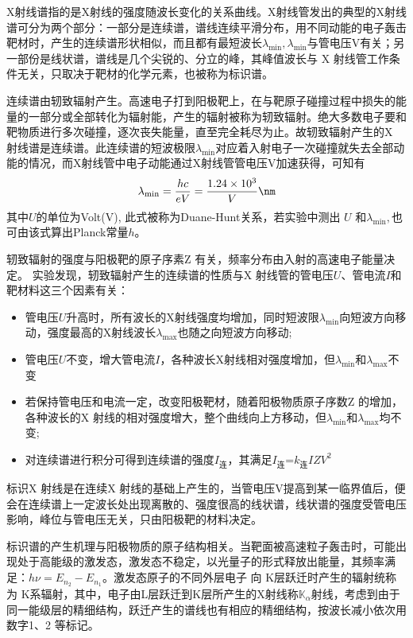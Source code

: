 \documentclass[10.5pt]{article}
\renewcommand{\=}[1]{\stackrel{#1}{=}} %
\theoremstyle{definition}
\theoremstyle{remark}
\begin{document}
	X射线谱指的是X射线的强度随波长变化的关系曲线。X射线管发出的典型的X射线 谱可分为两个部分：一部分是连续谱，谱线连续平滑分布，用不同动能的电子轰击靶材时，产生的连续谱形状相似，而且都有最短波长$\lambda_{\min},\lambda_{\min}$与管电压V有关；另一部份是线状谱，谱线是几个尖锐的、分立的峰，其峰值波长与 X 射线管工作条件无关，只取决于靶材的化学元素，也被称为标识谱。
	
	连续谱由轫致辐射产生。高速电子打到阳极靶上，在与靶原子碰撞过程中损失的能量的一部分或全部转化为辐射能，产生的辐射被称为轫致辐射。绝大多数电子要和靶物质进行多次碰撞，逐次丧失能量，直至完全耗尽为止。故轫致辐射产生的X 射线谱是连续谱。此连续谱的短波极限$\lambda_{\min}$对应着入射电子一次碰撞就失去全部动能的情况，而X射线管中电子动能通过X射线管管电压V加速获得，可知有
	\begin{equation}\label{eq:DH}
		\lambda_{\min}=\dfrac{hc}{eV}=\dfrac{1.24\times10^3}{V}\nm
	\end{equation}
	其中$U$的单位为Volt(V), 此式被称为Duane-Hunt关系，若实验中测出 $U$ 和$\lambda_{\min},$也可由该式算出Planck常量$h$。
	
	轫致辐射的强度与阳极靶的原子序素Z 有关，频率分布由入射的高速电子能量决定。 
	实验发现，轫致辐射产生的连续谱的性质与X 射线管的管电压$U$、管电流$I$和靶材料这三个因素有关：
	\begin{itemize}
		\item 管电压$U$升高时，所有波长的X射线强度均增加，同时短波限$\lambda_{\min}$向短波方向移动，强度最高的X射线波长$\lambda_{\max}$也随之向短波方向移动;
		\item 管电压$U$不变，增大管电流$I$，各种波长X射线相对强度增加，但$\lambda_{\min}$和$\lambda_{\max}$不变
		\item 若保持管电压和电流一定，改变阳极靶材，随着阳极物质原子序数Z 的增加，各种波长的X 射线的相对强度增大，整个曲线向上方移动，但$\lambda_{\min}$和$\lambda_{\max}$均不变;
		\item 对连续谱进行积分可得到连续谱的强度$I_{\text{连}}$，其满足$I_{\text{连}}$=$k_{\text{连}} IZV^2$
	\end{itemize}
	
	标识X 射线是在连续X 射线的基础上产生的，当管电压V提高到某一临界值后，便会在连续谱上一定波长处出现离散的、强度很高的线状谱，线状谱的强度受管电压影响，峰位与管电压无关，只由阳极靶的材料决定。
	
	标识谱的产生机理与阳极物质的原子结构相关。当靶面被高速粒子轰击时，可能出现处于高能级的激发态，激发态不稳定，以光量子的形式释放出能量，其频率满足：$h\nu=E_{n_2}-E_{n_1}$。激发态原子的不同外层电子 向 K层跃迁时产生的辐射统称为 K系辐射，其中，电子由L层跃迁到K层所产生的X射线称$\mathbb{K}_\alpha$射线，考虑到由于同一能级层的精细结构，跃迁产生的谱线也有相应的精细结构，按波长减小依次用数字1、2 等标记。
	
\end{document}
